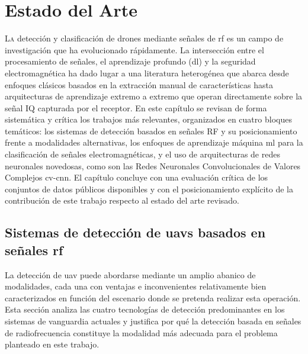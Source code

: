
\chapter{Estado del Arte}
\label{cap:EstadoDelArte}

\lettrine[lraise=-0.1, lines=2, loversize=0.2]{L}{a} detección y clasificación de drones mediante señales de \gls{rf} es un campo de investigación que ha evolucionado rápidamente. La intersección entre el procesamiento de señales, el aprendizaje profundo (\gls{dl}) y la seguridad electromagnética ha dado lugar a una literatura heterogénea que abarca desde enfoques clásicos basados en la extracción manual de características hasta arquitecturas de aprendizaje extremo a extremo que operan directamente sobre la señal IQ capturada por el receptor. En este capítulo se revisan de forma sistemática y crítica los trabajos más relevantes, organizados en cuatro bloques temáticos: los sistemas de detección basados en señales RF y su posicionamiento frente a modalidades alternativas, los enfoques de aprendizaje máquina \gls{ml} para la clasificación de señales electromagnéticas, y el uso de arquitecturas de redes neuronales novedosas, como son las Redes Neuronales Convolucionales de Valores Complejos \gls{cv-cnn}. El capítulo concluye con una evaluación crítica de los conjuntos de datos públicos disponibles y con el posicionamiento explícito de la contribución de este trabajo respecto al estado del arte revisado.

\section{Sistemas de detección de \glspl{uav} basados en señales \gls{rf}}
\label{sec:sistemas_deteccion_rf}

La detección de \gls{uav} puede abordarse mediante un amplio abanico de modalidades, cada una con ventajas e inconvenientes relativamente bien caracterizados en función del escenario donde se pretenda realizar esta operación. Esta sección analiza las cuatro tecnologías de detección predominantes en los sistemas de vanguardia actuales y justifica por qué la detección basada en señales de radiofrecuencia constituye la modalidad más adecuada para el problema planteado en este trabajo.

